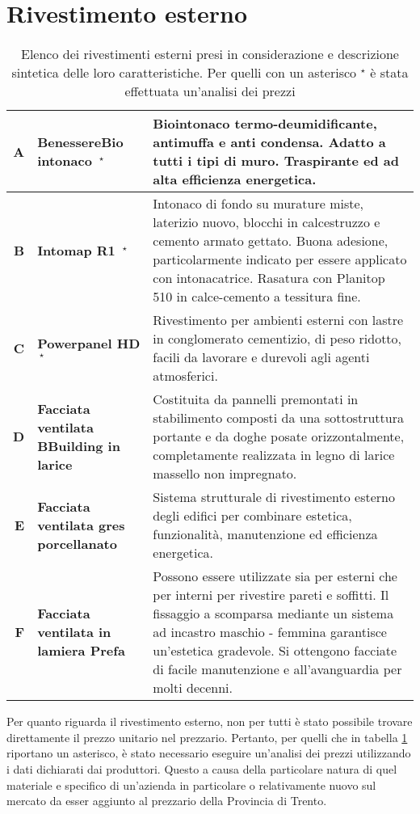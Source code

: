 \section{Rivestimento esterno}
\begin{table}[htbp]
\caption{Elenco dei rivestimenti esterni presi in considerazione e descrizione sintetica delle loro caratteristiche. Per quelli con un asterisco $^\star$ è stata effettuata un'analisi dei prezzi}
\label{MaterialiRIV}
\centering
\begin{tabularx}{\textwidth}{rXX}
    \toprule
        \textbf{A} & \textbf{BenessereBio intonaco $\,^\star$} & Biointonaco termo-deumidificante, antimuffa e anti condensa. 
        Adatto a tutti i tipi di muro. Traspirante ed ad alta efficienza energetica. \\\midrule
        \textbf{B} & \textbf{Intomap R1 $\,^\star$} & Intonaco di fondo su murature miste, laterizio nuovo, blocchi in calcestruzzo e cemento armato gettato.  Buona adesione, particolarmente indicato per essere applicato con intonacatrice. 
        Rasatura con Planitop 510 in calce-cemento a tessitura fine.\\\midrule
        \textbf{C} & \textbf{Powerpanel HD $\,^\star$} & Rivestimento per ambienti esterni con lastre in conglomerato cementizio, di peso ridotto, facili da lavorare e durevoli agli agenti atmosferici.\\\midrule
        \textbf{D} & \textbf{Facciata ventilata BBuilding in larice} & Costituita da pannelli premontati in stabilimento composti da una sottostruttura portante e da doghe posate orizzontalmente, completamente realizzata in legno di larice massello non impregnato.\\\midrule
        \textbf{E} & \textbf{Facciata ventilata gres porcellanato} & Sistema strutturale di rivestimento esterno degli edifici per combinare estetica, funzionalità, manutenzione ed efficienza energetica. \\\midrule
        \textbf{F} & \textbf{Facciata ventilata in lamiera Prefa} & Possono essere utilizzate sia per esterni che per interni per rivestire pareti e soffitti. Il fissaggio a scomparsa mediante un sistema ad incastro maschio - femmina garantisce un'estetica gradevole. Si ottengono facciate di facile manutenzione e all'avanguardia per molti decenni.\\
    \bottomrule
\end{tabularx}
\end{table}

Per quanto riguarda il rivestimento esterno, non per tutti è stato possibile trovare direttamente il prezzo unitario nel prezzario. 
Pertanto, per quelli che in tabella \ref{MaterialiRIV} riportano un asterisco, è stato necessario eseguire un'analisi dei prezzi utilizzando i dati dichiarati dai produttori. 
Questo a causa della particolare natura di quel materiale e specifico di un'azienda in particolare o relativamente nuovo sul mercato da esser aggiunto al prezzario della Provincia di Trento.

